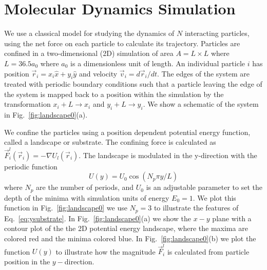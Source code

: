 \documentclass[twocolumn,preprintnumbers,amsmath,amssymb,aps,prx]{revtex4}
\begin{document}

\section{Molecular Dynamics Simulation}
\label{sec:MD}

We use a classical model for 
studying the dynamics of $N$ interacting particles,
using the net force on each particle to calculate
its trajectory.
Particles are confined in a two-dimensional (2D) 
simulation of area $A = L \times L$ where $L=36.5 a_0$
where $a_0$ is a dimensionless unit of length.
An individual particle $i$ has
position $\vec{r}_i = x_i \hat{x} + y_i \hat{y}$
and velocity $\vec{v}_i = d\vec{r}_i/dt$.
The edges of the system are treated with
periodic boundary conditions
such that a particle leaving the edge of the system is mapped
back to a position within the simulation 
by the transformation $x_i+L \rightarrow x_i$ and $y_i+L \rightarrow y_i$.
We show a schematic of the system in Fig.~\ref{fig:landscape0}(a).

We confine the particles using a position dependent 
potential energy function, called a landscape or substrate.
The confining force %
is calculated as 
 $\vec{F}^{l}_i(\vec{r}_i) = -\nabla U_l(\vec{r}_i)$.
% 
The landscape is modulated in the y-direction
with the periodic function 
 \begin{equation}
   U(y) = U_0 \cos{(N_p \pi y / L)}
     \label{eq:ysubstrate}
\end{equation}
 where $N_p$ are the number of periods,
 and $U_0$ is an adjustable parameter
 to set the depth of the minima
 with simulation units of energy $E_0 = 1$. 
 We plot this function in 
 Fig.~\ref{fig:landscape0}
 we use $N_p = 3$ to illustrate the features of
 Eq.~\ref{eq:ysubstrate}.
 In Fig.~\ref{fig:landscape0}(a) we show 
 the $x-y$ plane with a contour plot
 of the the 2D potential energy landscape,
 where 
 the maxima are colored red and the minima colored blue.
 In Fig.~\ref{fig:landscape0}(b) we plot the function
 $U(y)$ to illustrate how the magnitude
 $\vec{F}^{l}_i$ is calculated from particle position in the $y-$direction.
 
\end{document}
